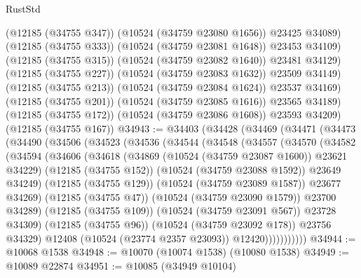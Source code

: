 \begin{lexlean}{RustStd}
\begin{coremodule}
                  (@12185 (@34755 @347))
                  (@10524 (@34759 @23080 @1656))
                  @23425
                  @34089)
                (@12185 (@34755 @333))
                (@10524 (@34759 @23081 @1648))
                @23453
                @34109)
              (@12185 (@34755 @315))
              (@10524 (@34759 @23082 @1640))
              @23481
              @34129)
            (@12185 (@34755 @227))
            (@10524 (@34759 @23083 @1632))
            @23509
            @34149)
          (@12185 (@34755 @213))
          (@10524 (@34759 @23084 @1624))
          @23537
          @34169)
        (@12185 (@34755 @201))
        (@10524 (@34759 @23085 @1616))
        @23565
        @34189)
      (@12185 (@34755 @172))
      (@10524 (@34759 @23086 @1608))
      @23593
      @34209)
    (@12185 (@34755 @167))
@34943 := @34403
    (@34428
      (@34469
        (@34471
          (@34473
            (@34490
              (@34506
                (@34523
                  (@34536
                    (@34544
                      (@34548
                        (@34557
                          (@34570
                            (@34582
                              (@34594
                                (@34606
                                  (@34618
                                    (@34869 (@10524 (@34759 @23087 @1600)) @23621 @34229)
                                    (@12185 (@34755 @152))
                                    (@10524 (@34759 @23088 @1592))
                                    @23649
                                    @34249)
                                  (@12185 (@34755 @129))
                                  (@10524 (@34759 @23089 @1587))
                                  @23677
                                  @34269)
                                (@12185 (@34755 @47))
                                (@10524 (@34759 @23090 @1579))
                                @23700
                                @34289)
                              (@12185 (@34755 @109))
                              (@10524 (@34759 @23091 @567))
                              @23728
                              @34309)
                            (@12185 (@34755 @96))
                            (@10524 (@34759 @23092 @178))
                            @23756
                            @34329)
                          @12408
                          (@10524 (@23774 @2357 @23093))
                          @12420)))))))))))
@34944 := @10068 @1538
@34948 := @10070 (@10074 @1538) (@10080 @1538)
@34949 := @10089 @22874
@34951 := @10085 (@34949 @10104)

\end{coremodule}
\end{lexlean}
